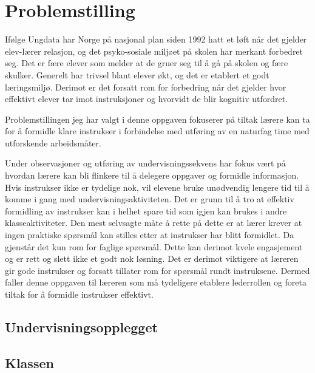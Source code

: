 \documentclass[main.tex]{subfiles}
\begin{document}
\section*{Problemstilling}      
If\o lge Ungdata\cite[legg til referanse]{ungdata} har Norge p\aa\hspace{1mm} nasjonal 
plan siden 1992 hatt et l\o ft n\aa r det gjelder elev-l\ae rer 
relasjon, og det psyko-sosiale milj\o et p\aa\hspace{1mm} skolen har merkant 
forbedret seg. Det er f\ae re elever som melder at de gruer seg til \aa\hspace{1mm} 
g\aa\hspace{1mm} p\aa\hspace{1mm} skolen og f\ae re skulker. Generelt har trivsel 
blant elever \o kt, og det er etablert et godt l\ae ringsmilj\o . Derimot er det 
forsatt rom for forbedring n\aa r det gjelder hvor effektivt elever tar imot 
instruksjoner og hvorvidt de blir kognitiv utfordret. \newline

Problemstillingen jeg har valgt i denne oppgaven fokuserer  p\aa\hspace{1mm} tiltak 
l\ae rere kan ta for \aa\hspace{1mm} formidle klare instrukser i forbindelse med utf\o ring av en 
naturfag time med utforskende arbeidsm\aa ter\cite[legg til referanse 1 og 2]{utforsk}. 
\newline

Under observasjoner og 
utf\o ring av undervisningssekvens har fokus v\ae rt p\aa\hspace{1mm} hvordan 
l\ae rere kan bli flinkere til \aa\hspace{1mm} delegere oppgaver og formidle 
informasjon. Hvis instrukser ikke er tydelige nok, vil elevene bruke un\o dvendig 
lengere tid til \aa\hspace{1mm} komme i gang med undervisningsaktiviteten. Det 
er grunn til \aa\hspace{1mm} tro at effektiv formidling av instrukser kan i 
helhet spare tid som igjen kan brukes i andre klasseaktiviteter. Den mest selvsagte m\aa te
\aa\hspace{1mm} rette p\aa\hspace{1mm} dette er at l\ae rer krever at ingen
praktiske
sp\o rsm\aa l kan stilles etter at instrukser har blitt formidlet. Da gjenst\aa r
det kun rom for faglige sp\o rsm\aa l. Dette kan derimot kvele engasjement og er
rett og slett ikke et godt nok l\o sning. Det er derimot viktigere at l\ae reren
gir gode instrukser og forsatt tillater rom for sp\o rsm\aa l rundt instruksene.
Dermed faller denne oppgaven til l\ae reren som m\aa\hspace{1mm} tydeligere
etablere lederrollen og foreta tiltak for \aa\hspace{1mm} formidle instrukser 
effektivt.

\subsection*{Undervisningsopplegget}

\subsection*{Klassen}
\newpage\null
\end{document}
